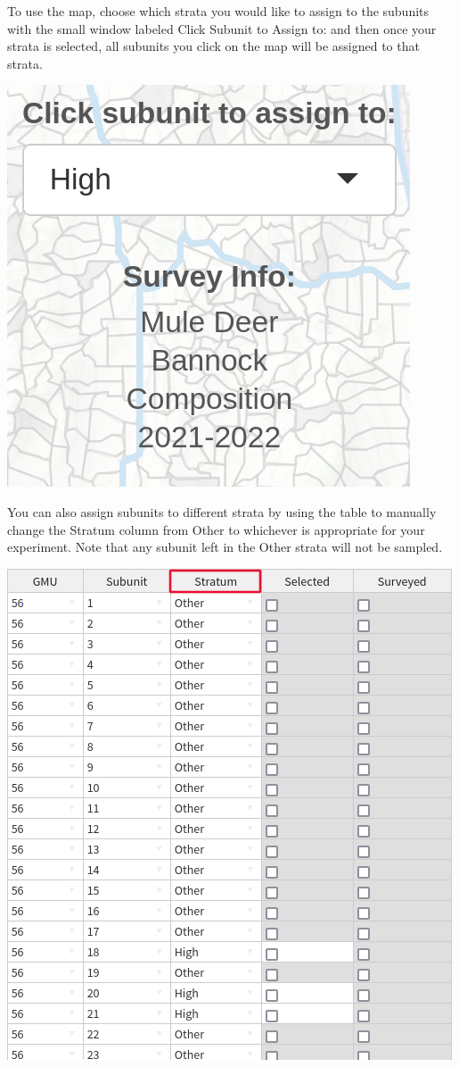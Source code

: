 \documentclass[
]{book}
\begin{document}
To use the map, choose which strata you would like to assign to the subunits with the small window labeled Click Subunit to Assign to: and then once your strata is selected, all subunits you click on the map will be assigned to that strata.

\includegraphics{./www/de_walk6.png}

You can also assign subunits to different strata by using the table to manually change the Stratum column from Other to whichever is appropriate for your experiment. Note that any subunit left in the Other strata will not be sampled.

\includegraphics{./www/de_walk7.png}
\end{document}
